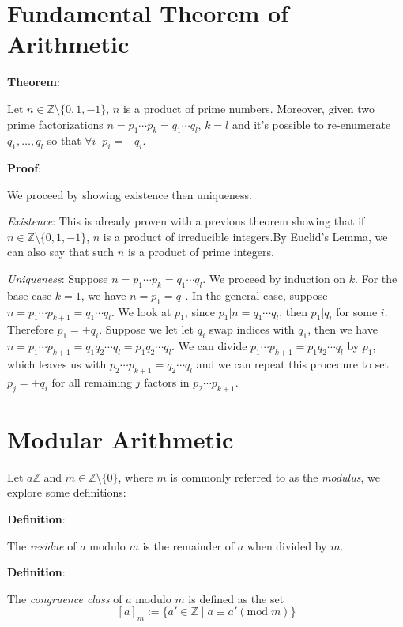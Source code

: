 \documentclass{article}
\begin{document}
\begin{multicols*}{2}
\section{Fundamental Theorem of Arithmetic}

\textbf{Theorem}:

Let $n \in \mathbb{Z}\setminus\{0,1,-1\}$, $n$ is a product of prime numbers. Moreover, given two prime factorizations $n = p_1 \cdots p_k = q_1 \cdots q_l$, $k=l$ and it's possible to re-enumerate $q_1,\ldots,q_l$ so that $\forall i\;\; p_i = \pm q_i$.

\textbf{Proof}:

We proceed by showing existence then uniqueness.

\textit{Existence}: This is already proven with a previous theorem showing that if $n \in \mathbb{Z}\setminus\{0,1,-1\}$, $n$ is a product of irreducible integers.By Euclid's Lemma, we can also say that such $n$ is a product of prime integers.

\textit{Uniqueness}: Suppose $n = p_1 \cdots p_k = q_1 \cdots q_l$. We proceed by induction on $k$. For the base case $k = 1$, we have $n = p_1 = q_1$. In the general case, suppose $n = p_1 \cdots p_{k+1} = q_1 \cdots q_l$. We look at $p_1$, since $p_1 |n = q_1 \cdots q_l$, then $p_1|q_i$ for some $i$. Therefore $p_1 = \pm q_i$. Suppose we let let $q_i$ swap indices with $q_1$, then we have $n = p_1 \cdots p_{k+1} = q_1q_2 \cdots q_l = p_1 q_2 \cdots q_l$. We can divide $p_1 \cdots p_{k+1} = p_1 q_2 \cdots q_l$ by $p_1$, which leaves us with $p_2 \cdots p_{k+1} = q_2 \cdots q_l$ and we can repeat this procedure to set $p_j = \pm q_i$ for all remaining $j$ factors in $p_2 \cdots p_{k+1}$.

\section{Modular Arithmetic}

Let $a \mathbb{Z}$ and $m \in \mathbb{Z}\setminus\{0\}$, where $m$ is commonly referred to as the \textit{modulus}, we explore some definitions:

\textbf{Definition}:

The \textit{residue} of $a$ modulo $m$ is the remainder of $a$ when divided by $m$.

\textbf{Definition}:

The \textit{congruence class} of $a$ modulo $m$ is defined as the set \[[a]_m := \{a' \in \mathbb{Z} \;|\; a \equiv a' (\mathrm{mod} \;m)\}\]


\end{multicols*}
\end{document}
